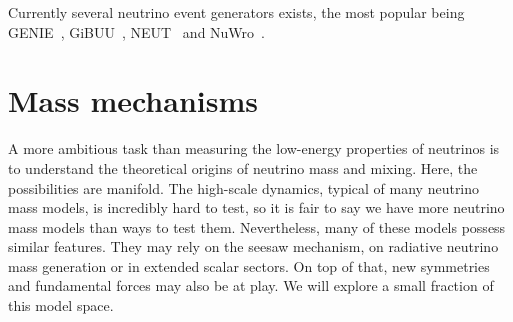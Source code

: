 Currently several neutrino event generators exists, the most popular being GENIE~\cite{Andreopoulos:2009rq}, GiBUU~\cite{Buss:2011mx}, NEUT~\cite{Hayato:2002sd} and NuWro~\cite{Juszczak:2005zs}.

\section{Mass mechanisms}

A more ambitious task than measuring the low-energy properties of neutrinos is to understand the theoretical origins of neutrino mass and mixing. Here, the possibilities are manifold. The high-scale dynamics, typical of many neutrino mass models, is incredibly hard to test, so it is fair to say we have more neutrino mass models than ways to test them. Nevertheless, many of these models possess similar features. They may rely on the seesaw mechanism, on radiative neutrino mass generation or in extended scalar sectors. On top of that, new symmetries and fundamental forces may also be at play. We will explore a small fraction of this model space.


